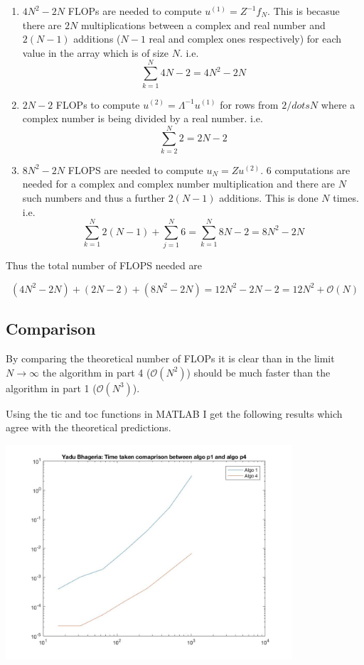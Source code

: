\documentclass{article}
\begin{document}
\begin{enumerate}
	\item $4N^2 - 2N$ FLOPs are needed to compute $u^{(1)} = Z^{-1} f_N$. This is becasue there are $2N$ multiplications between a complex and real number and $2(N-1)$ additions ($N-1$ real and complex ones respectively) for each value in the array which is of size $N$. i.e. $$ \sum^{N}_{k=1} 4N - 2 = 4N^2 - 2N $$
	\item $2N - 2$ FLOPs to compute $u^{(2)} = \Lambda^{-1} u^{(1)}$ for rows from $2 /dots N$ where a complex number is being divided by a real number. i.e. $$ \sum^{N}_{k=2} 2 = 2N - 2$$
	\item $8N^2 - 2N$ FLOPS are needed to compute $u_N = Z u^{(2)}$. $6$ computations are needed for a complex and complex number multiplication and there are $N$ such numbers and thus a further $2(N-1)$ additions. This is done $N$ times. i.e. $$ \sum^{N}_{k=1} 2(N - 1) + \sum^{N}_{j=1} 6 =  \sum^{N}_{k=1} 8N - 2 = 8N^2 - 2N $$
\end{enumerate}

Thus the total number of FLOPS needed are

\[
	(4N^2 - 2N) + (2N - 2) + (8N^2 - 2N) = 12N^2 - 2N - 2 = 12N^2 + \mathcal{O}(N)
\]

\subsection{Comparison}

By comparing the theoretical number of FLOPs it is clear than in the limit $N \rightarrow \infty$ the algorithm in part 4 ($\mathcal{O}(N^2)$) should be much faster than the algorithm in part 1 ($\mathcal{O}(N^3)$).

Using the tic and toc functions in MATLAB I get the following results which agree with the theoretical predictions.

\includegraphics[width = 0.8\textwidth]{fig_timetaken_p1p4.jpg}
\end{document}
